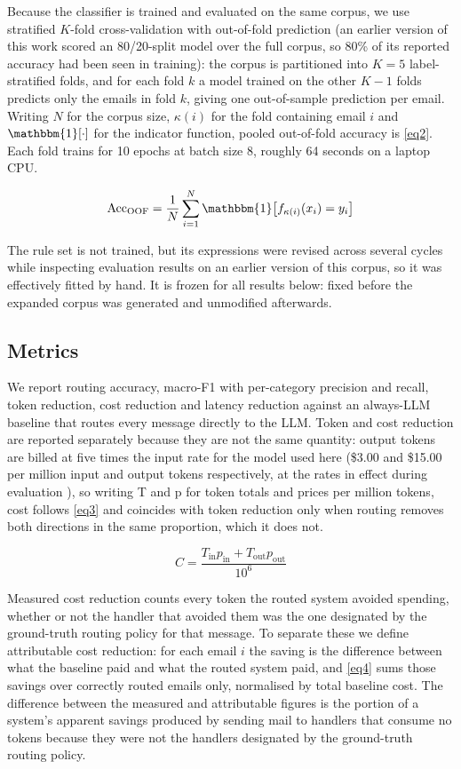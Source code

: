 \documentclass[conference]{IEEEtran}
\begin{document}
Because the classifier is trained and evaluated on the same corpus, we use stratified $K$-fold cross-validation with out-of-fold prediction (an earlier version of this work scored an 80/20-split model over the full corpus, so 80\% of its reported accuracy had been seen in training): the corpus is partitioned into $K=5$ label-stratified folds, and for each fold $k$ a model trained on the other $K-1$ folds predicts only the emails in fold $k$, giving one out-of-sample prediction per email. Writing $N$ for the corpus size, $\kappa(i)$ for the fold containing email $i$ and $\mathbbm{1}[\cdot]$ for the indicator function, pooled out-of-fold accuracy is \eqref{eq2}. Each fold trains for 10 epochs at batch size 8, roughly 64 seconds on a laptop CPU.

\begin{equation}
\mathrm{Acc}_{\mathrm{OOF}}
=
\frac{1}{N}
\sum_{i=1}^{N}
\mathbbm{1}\bigl[f_{\kappa(i)}(x_i)=y_i\bigr]
\label{eq2}
\end{equation}

The rule set is not trained, but its expressions were revised across several cycles while inspecting evaluation results on an earlier version of this corpus, so it was effectively fitted by hand. It is frozen for all results below: fixed before the expanded corpus was generated and unmodified afterwards.

\subsection{Metrics}
We report routing accuracy, macro-F1 with per-category precision and recall, token reduction, cost reduction and latency reduction against an always-LLM baseline that routes every message directly to the LLM. Token and cost reduction are reported separately because they are not the same quantity: output tokens are billed at five times the input rate for the model used here (\$3.00 and \$15.00 per million input and output tokens respectively, at the rates in effect during evaluation \cite{b19}), so writing T and p for token totals and prices per million tokens, cost follows \eqref{eq3} and coincides with token reduction only when routing removes both directions in the same proportion, which it does not.

\begin{equation}
C =
\frac{T_{\mathrm{in}}p_{\mathrm{in}} +
T_{\mathrm{out}}p_{\mathrm{out}}}{10^6}
\label{eq3}
\end{equation}

Measured cost reduction counts every token the routed system avoided spending, whether or not the handler that avoided them was the one designated by the ground-truth routing policy for that message. To separate these we define attributable cost reduction: for each email $i$ the saving is the difference between what the baseline paid and what the routed system paid, and \eqref{eq4} sums those savings over correctly routed emails only, normalised by total baseline cost. The difference between the measured and attributable figures is the portion of a system's apparent savings produced by sending mail to handlers that consume no tokens because they were not the handlers designated by the ground-truth routing policy.
\end{document}
